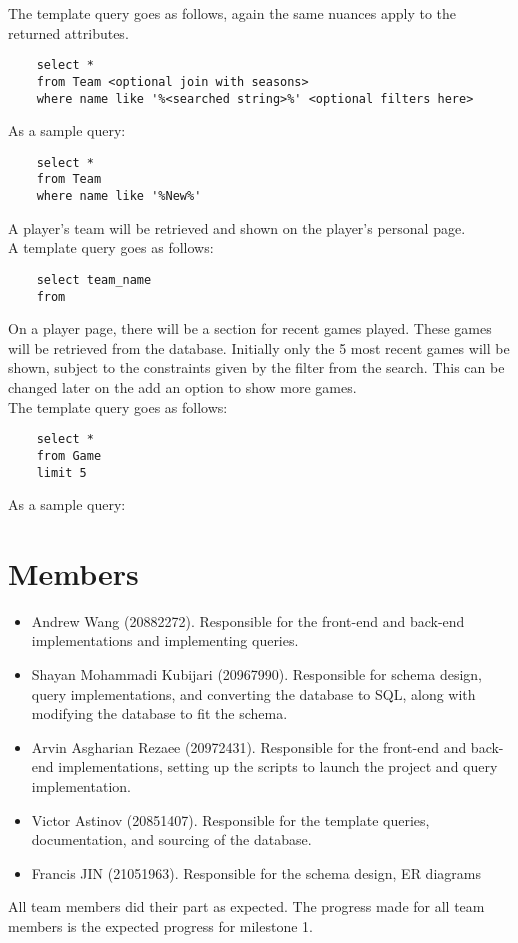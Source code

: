 \documentclass[11pt]{article}
\begin{document}
The template query goes as follows, again the same nuances apply to the returned attributes.
\begin{verbatim}
    select *
    from Team <optional join with seasons>
    where name like '%<searched string>%' <optional filters here>
\end{verbatim}

As a sample query:
\begin{verbatim}
    select *
    from Team
    where name like '%New%'
\end{verbatim}

A player's team will be retrieved and shown on the player's personal page.\\ 

A template query goes as follows:
\begin{verbatim}
    select team_name
    from 
\end{verbatim}

On a player page, there will be a section for recent games played. These games will be retrieved from the database. Initially only the 5 most recent games will be shown, subject to the constraints given by the filter from the search. This can be changed later on the add an option to show more games. \\

The template query goes as follows:

\begin{verbatim}
    select *
    from Game
    limit 5
\end{verbatim}

As a sample query:

\section{Members}
\begin{itemize}
    \item Andrew Wang (20882272). Responsible for the front-end and back-end implementations and implementing queries.
    \item Shayan Mohammadi Kubijari (20967990). Responsible for schema design, query implementations, and converting the database to SQL, along with modifying the database to fit the schema.
    \item Arvin Asgharian Rezaee (20972431). Responsible for the front-end and back-end implementations, setting up the scripts to launch the project and query implementation.
    \item Victor Astinov (20851407). Responsible for the template queries, documentation, and sourcing of the database.
    \item Francis JIN (21051963). Responsible for the schema design, ER diagrams
\end{itemize}

All team members did their part as expected. The progress made for all team members is the expected progress for milestone 1.
\end{document}

